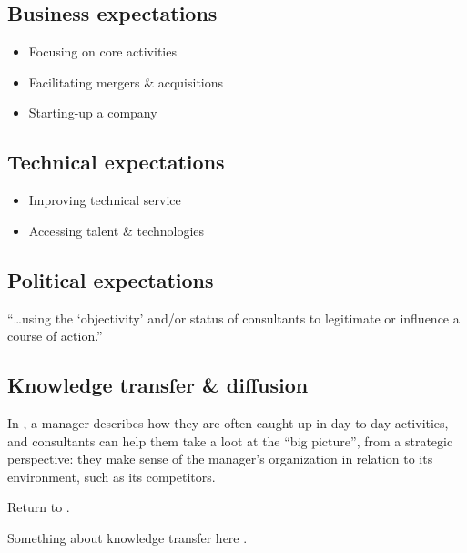 \documentclass[12pt]{article}
\providecommand{\tightlist}{%
  \setlength{\itemsep}{0pt}\setlength{\parskip}{0pt}}
\begin{document}
\hypertarget{business-expectations}{%
\subsection{Business expectations}\label{business-expectations}}

\begin{itemize}
\tightlist
\item
  Focusing on core activities
\item
  Facilitating mergers \& acquisitions
\item
  Starting-up a company
\end{itemize}

\hypertarget{technical-expectations}{%
\subsection{Technical expectations}\label{technical-expectations}}

\begin{itemize}
\tightlist
\item
  Improving technical service
\item
  Accessing talent \& technologies
\end{itemize}

\hypertarget{political-expectations}{%
\subsection{Political expectations}\label{political-expectations}}

``\ldots using the `objectivity' and/or status of consultants to
legitimate or influence a course of action.'' \citep[ 233]{sturdy1998}

\hypertarget{knowledge-transfer-diffusion}{%
\subsection{Knowledge transfer \&
diffusion}\label{knowledge-transfer-diffusion}}

In \citet[53]{werr2002}, a manager describes how they are often caught
up in day-to-day activities, and consultants can help them take a loot
at the ``big picture'', from a strategic perspective: they make sense of
the manager's organization in relation to its environment, such as its
competitors.

Return to \citet{turner1982}.

Something about knowledge transfer here \citep{sturdy2009}.
\end{document}
